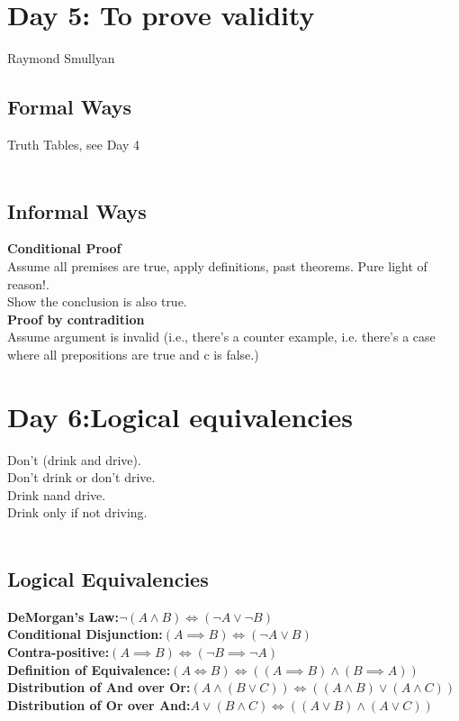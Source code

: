 \documentclass{article}
\begin{document}
	\section{Day 5: To prove validity}
	Raymond Smullyan\\
	\subsection{Formal Ways}
	Truth Tables, see Day 4\\\\
	\subsection{Informal Ways}
	\textbf{Conditional Proof}\\
	Assume all premises are true, apply definitions, past theorems. Pure light of reason!.\\
	Show the conclusion is also true.\\
	\textbf{Proof by contradition}\\
	Assume argument is invalid (i.e., there's a counter example, i.e. there's a case where all prepositions are true and c is false.)\\
	\section{Day 6:Logical equivalencies}
	Don't (drink and drive).\\
	Don't drink or don't drive.\\
	Drink nand drive.\\
	Drink only if not driving.\\
	\\
	\subsection{Logical Equivalencies}
	\textbf{DeMorgan's Law:}$\lnot(A \land B)\iff(\lnot A \lor \lnot B)$\\
	\textbf{Conditional Disjunction:}$(A \implies B)\iff(\lnot A \lor B)$\\
	\textbf{Contra-positive:}$(A \implies B)\iff(\lnot B \implies \lnot A)$\\
	\textbf{Definition of Equivalence:}$(A \iff B)\iff((A \implies B)\land(B \implies A))$\\
	\textbf{Distribution of And over Or:}$(A \land (B \lor C)) \iff ((A \land B) \lor (A \land C))$\\
	\textbf{Distribution of Or over And:}$A \lor (B \land C) \iff ((A \lor B)\land(A \lor C))$\\
\end{document}
